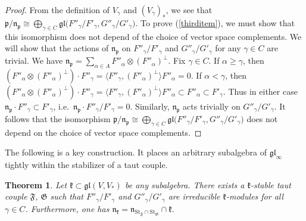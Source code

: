 \documentclass{article}
\newcommand {\St} {\mathrm{St}}
\def\gl{\mathfrak {gl}}
\def\n{\mathfrak {n}}
\def\p{\mathfrak {p}}
\def\k{\mathfrak{k}}
\def\F{\mathfrak{F}}
\def\G{\mathfrak{G}}
\newtheorem{thm}{Theorem}[section]
\begin{document}
\begin{proof}
From the definition of $V_\gamma$ and $(V_\gamma)_*$, we see that  ${\p} / {\n_\p} \cong \bigoplus_{\gamma \in C} \gl \big({F''_\gamma} / {F'_\gamma} , {G''_\gamma} / {G'_\gamma} \big)$.  To prove (\ref{thirditem}), we must show that this isomorphism does not depend of the choice of vector space complements.  We will show that the actions of $\n_\p$ on ${F''_\gamma} / {F'_\gamma}$ and ${G''_\gamma} / {G'_\gamma}$ for any $\gamma \in C$ are trivial.  We have $\n_\p = \sum_{\alpha \in A} F''_\alpha \otimes (F''_\alpha)^\perp$.  Fix $\gamma \in C$.  If $\alpha \geq \gamma$, then $(F''_\alpha \otimes (F''_\alpha)^\perp) \cdot F''_\gamma = \langle F''_\gamma, (F''_\alpha)^\perp \rangle F''_\alpha = 0$.  If $\alpha < \gamma$, then $(F''_\alpha \otimes (F''_\alpha)^\perp) \cdot F''_\gamma = \langle F''_\gamma, (F''_\alpha)^\perp \rangle F''_\alpha \subset F''_\alpha \subset F'_\gamma$.  Thus in either case $\n_\p \cdot F''_\gamma \subset F'_\gamma$, i.e.\ $\n_\p \cdot {F''_\gamma} / {F'_\gamma} = 0$.  Similarly, $\n_\p$ acts trivially on ${G''_\gamma} / {G'_\gamma}$.  It follows that the isomorphism ${\p} / {\n_\p} \cong \bigoplus_{\gamma \in C} \gl \big({F''_\gamma} / {F'_\gamma} , {G''_\gamma} / {G'_\gamma} \big)$ does not depend on the choice of vector space complements.
\end{proof}


The following is a key construction.  It places an arbitrary subalgebra of $\gl_\infty$ tightly within the stabilizer of a taut couple.  


\begin{thm} \label{tautcouple}
Let $\k \subset \gl(V,V_*)$ be any subalgebra. There exists a $\k$-stable taut couple $\F$, $\G$ such that ${F''_\gamma} / {F'_\gamma}$ and ${G''_\gamma} / {G'_\gamma}$ are irreducible $\k$-modules for all $\gamma \in C$.  Furthermore, one has $\n_\k = \n_{\St_\F \cap \St_\G} \cap \k$.
\end{thm}
\end{document}
